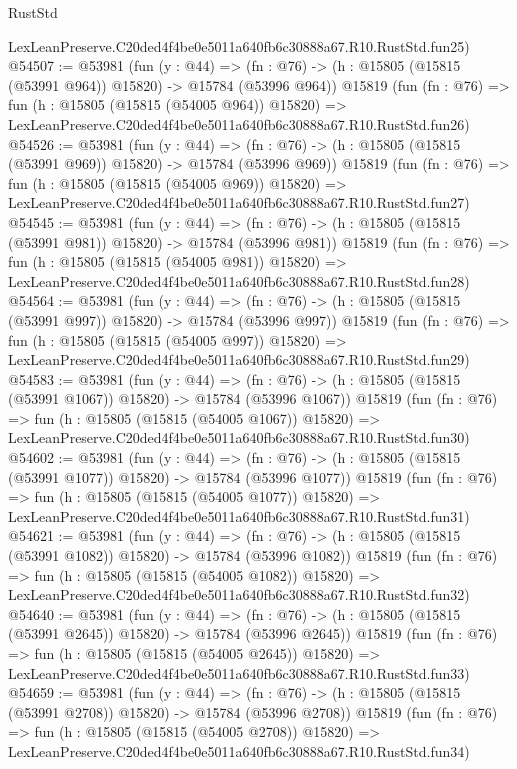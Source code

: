 \begin{lexlean}{RustStd}
\begin{coremodule}
    LexLeanPreserve.C20ded4f4be0e5011a640fb6c30888a67.R10.RustStd.fun25)
@54507 := @53981
    (fun (y : @44) =>
    (fn : @76) -> (h : @15805 (@15815 (@53991 @964)) @15820) -> @15784 (@53996 @964))
    @15819
    (fun (fn : @76) =>
    fun (h : @15805 (@15815 (@54005 @964)) @15820) =>
    LexLeanPreserve.C20ded4f4be0e5011a640fb6c30888a67.R10.RustStd.fun26)
@54526 := @53981
    (fun (y : @44) =>
    (fn : @76) -> (h : @15805 (@15815 (@53991 @969)) @15820) -> @15784 (@53996 @969))
    @15819
    (fun (fn : @76) =>
    fun (h : @15805 (@15815 (@54005 @969)) @15820) =>
    LexLeanPreserve.C20ded4f4be0e5011a640fb6c30888a67.R10.RustStd.fun27)
@54545 := @53981
    (fun (y : @44) =>
    (fn : @76) -> (h : @15805 (@15815 (@53991 @981)) @15820) -> @15784 (@53996 @981))
    @15819
    (fun (fn : @76) =>
    fun (h : @15805 (@15815 (@54005 @981)) @15820) =>
    LexLeanPreserve.C20ded4f4be0e5011a640fb6c30888a67.R10.RustStd.fun28)
@54564 := @53981
    (fun (y : @44) =>
    (fn : @76) -> (h : @15805 (@15815 (@53991 @997)) @15820) -> @15784 (@53996 @997))
    @15819
    (fun (fn : @76) =>
    fun (h : @15805 (@15815 (@54005 @997)) @15820) =>
    LexLeanPreserve.C20ded4f4be0e5011a640fb6c30888a67.R10.RustStd.fun29)
@54583 := @53981
    (fun (y : @44) =>
    (fn : @76) -> (h : @15805 (@15815 (@53991 @1067)) @15820) -> @15784 (@53996 @1067))
    @15819
    (fun (fn : @76) =>
    fun (h : @15805 (@15815 (@54005 @1067)) @15820) =>
    LexLeanPreserve.C20ded4f4be0e5011a640fb6c30888a67.R10.RustStd.fun30)
@54602 := @53981
    (fun (y : @44) =>
    (fn : @76) -> (h : @15805 (@15815 (@53991 @1077)) @15820) -> @15784 (@53996 @1077))
    @15819
    (fun (fn : @76) =>
    fun (h : @15805 (@15815 (@54005 @1077)) @15820) =>
    LexLeanPreserve.C20ded4f4be0e5011a640fb6c30888a67.R10.RustStd.fun31)
@54621 := @53981
    (fun (y : @44) =>
    (fn : @76) -> (h : @15805 (@15815 (@53991 @1082)) @15820) -> @15784 (@53996 @1082))
    @15819
    (fun (fn : @76) =>
    fun (h : @15805 (@15815 (@54005 @1082)) @15820) =>
    LexLeanPreserve.C20ded4f4be0e5011a640fb6c30888a67.R10.RustStd.fun32)
@54640 := @53981
    (fun (y : @44) =>
    (fn : @76) -> (h : @15805 (@15815 (@53991 @2645)) @15820) -> @15784 (@53996 @2645))
    @15819
    (fun (fn : @76) =>
    fun (h : @15805 (@15815 (@54005 @2645)) @15820) =>
    LexLeanPreserve.C20ded4f4be0e5011a640fb6c30888a67.R10.RustStd.fun33)
@54659 := @53981
    (fun (y : @44) =>
    (fn : @76) -> (h : @15805 (@15815 (@53991 @2708)) @15820) -> @15784 (@53996 @2708))
    @15819
    (fun (fn : @76) =>
    fun (h : @15805 (@15815 (@54005 @2708)) @15820) =>
    LexLeanPreserve.C20ded4f4be0e5011a640fb6c30888a67.R10.RustStd.fun34)

\end{coremodule}
\end{lexlean}

